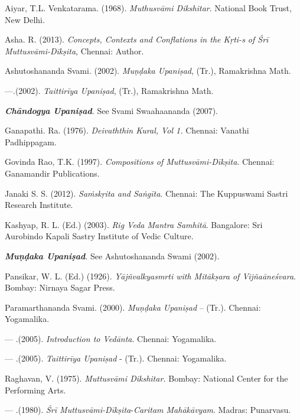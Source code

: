 \begin{thebibliography}{99}
\itemsep=1pt

  Aiyar, T.L. Venkatarama. (1968). \textit{Muthusvāmi Dikshitar}. National Book Trust, New Delhi.

  Asha. R. (2013). \textit{Concepts, Contexts and Conflations in the Kṛti-s of Śrī Muttusvāmi-Dīkṣita}, Chennai: Author.

  Ashutoshananda Svami. (2002). \textit{Muṇḍaka Upaniṣad}, (Tr.), Ramakrishna Math.

  —.(2002). \textit{Taittirīya Upaniṣad}, (Tr.), Ramakrishna Math.

  \textbf{\textit{Chāndogya Upaniṣad}}. See Svami Swaahaananda (2007).

  Ganapathi. Ra. (1976). \textit{Deivaththin Kural, Vol 1.} Chennai: Vanathi Padhippagam.

  Govinda Rao, T.K. (1997). \textit{Compositions of Muttusvāmi-Dīkṣita}. Chennai: Ganamandir Publications.

  Janaki S. S. (2012). \textit{Saṁskṛita and Saṅgīta}. Chennai: The Kuppuswami Sastri Research Institute.

  Kashyap, R. L. (Ed.) (2003). \textit{Rig Veda Mantra Samhitā}. Bangalore: Sri Aurobindo Kapali Sastry Institute of Vedic Culture.

  \textbf{\textit{Muṇḍaka Upaniṣad}}. See Ashutoshananda Swami (2002).

  Pansikar, W. L. (Ed.) (1926). \textit{Yājñvalkyasmrti with Mitākṣara of Vijñaāneśvara}. Bombay: Nirnaya Sagar Press.

  Paramarthananda Svami. (2000). \textit{Muṇḍaka Upaniṣad} – (Tr.). Chennai: Yogamalika.

  — .(2005). \textit{Introduction to Vedānta}. Chennai: Yogamalika.

  — .(2005). \textit{Taittirīya Upaniṣad} - (Tr.). Chennai: Yogamalika.

  Raghavan, V. (1975). \textit{Muttusvāmi Dikshitar.} Bombay: National Center for the Performing Arts.

  — .(1980). \textit{Śrī Muttusvāmi-Dīkṣita}-\textit{Caritam Mahākāvyam}. Madras: Punarvasu.


\end{thebibliography}
